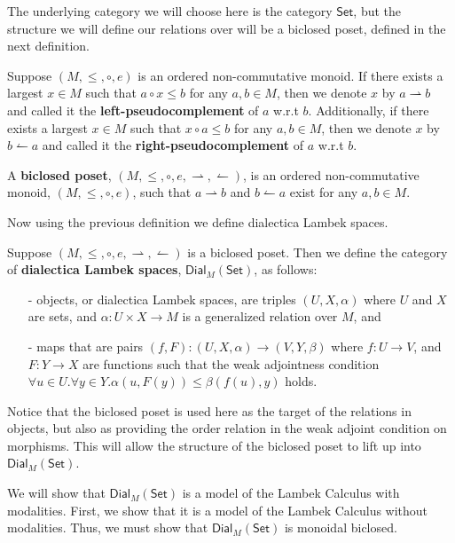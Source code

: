\documentclass{llncs}
\let\mto\to                     %
\let\to\relax                   %
\newcommand{\to}{\rightarrow}
\newcommand{\rto}{\leftharpoonup}
\newcommand{\lto}{\rightharpoonup}
\newcommand{\Set}{\mathsf{Set}}
\newcommand{\Dial}[2]{\mathsf{Dial}_{#1}(#2)}
\begin{document}
The underlying category we will choose here is the category $\Set$,
but the structure we will define our relations over will be a biclosed
poset, defined in the next definition.
\begin{definition}
  \label{def:biclosed-poset}
  Suppose $(M, \leq, \circ, e)$ is an ordered non-commutative monoid.
  If there exists a largest $x \in M$ such that $a \circ x \leq b$ for
  any $a, b \in M$, then we denote $x$ by $a \lto b$ and called it
  the \textbf{left-pseudocomplement} of $a$ w.r.t $b$.  Additionally,
  if there exists a largest $x \in M$ such that $x \circ a \leq b$ for
  any $a, b \in M$, then we denote $x$ by $b \rto a$ and called it
  the \textbf{right-pseudocomplement} of $a$ w.r.t $b$.

  A \textbf{biclosed poset}, $(M, \leq, \circ, e, \lto, \rto)$, is an
  ordered non-commutative monoid, $(M, \leq, \circ, e)$, such that $a
  \lto b$ and $b \rto a$ exist for any $a,b \in M$.
\end{definition}
\noindent
Now using the previous definition we define dialectica Lambek spaces.
\begin{definition}
  \label{def:dialectica-lambek-spaces}
  Suppose $(M, \leq, \circ, e, \lto, \rto)$ is a biclosed poset. Then
  we define the category of \textbf{dialectica Lambek spaces},
  $\mathsf{Dial}_M(\Set)$, as follows:
  \begin{itemize}
  \item[-] objects, or dialectica Lambek spaces, are triples $(U, X,
    \alpha)$ where $U$ and $X$ are sets, and $\alpha : U \times X \mto
    M$ is a generalized relation over $M$, and

  \item[-] maps that are pairs $(f, F) : (U , X, \alpha) \mto (V , Y ,
    \beta)$ where $f : U \mto V$, and $F : Y \mto X$ are functions
    such that the weak adjointness condition
    $\forall u \in U.\forall y \in Y. \alpha(u , F(y)) \leq \beta(f(u), y)$
    holds.
  \end{itemize}
\end{definition}
Notice that the biclosed poset is used here as the target of the
relations in objects, but also as providing the order  relation in the weak adjoint condition on morphisms.  This will allow the structure of the biclosed
poset to lift up into $\Dial{M}{\Set}$.

We will show that $\Dial{M}{\Set}$ is a model of the Lambek Calculus with
modalities.  First, we show that it is a model of the Lambek Calculus
without modalities.  Thus, we must show that $\Dial{M}{\Set}$ is
monoidal biclosed.
\end{document}
